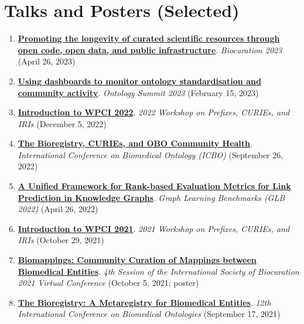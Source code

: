 \documentclass[10pt,a4paper,sans]{moderncv} %
\begin{document}
\section{Talks and Posters (Selected)}
\begin{enumerate}
\itemsep0.5em
    \item \textbf{\href{https://docs.google.com/presentation/d/1hEryoMNyp8gwt2pvPy2ErKaw_QPvnWOmzPT0Sn4Yl4s/edit?usp=sharing}{Promoting the longevity of curated scientific resources through open code, open data, and public infrastructure}}. \textit{Biocuration 2023} (April 26, 2023)

    \item \textbf{\href{https://docs.google.com/presentation/d/1oKxBzSCZGuFlIhw6jAXw00xgEGs7KgmaVR54NEdPprw/edit?usp=sharing}{Using dashboards to monitor ontology standardisation and community activity}}. \textit{Ontology Summit 2023} (February 15, 2023)

    \item \textbf{\href{https://docs.google.com/presentation/d/1Vq-tdq_PYSmKydKXEABElgt3oqYs_ridquHDLeUFL1A/edit?usp=sharing}{Introduction to WPCI 2022}}. \textit{2022 Workshop on Prefixes, CURIEs, and IRIs} (December 5, 2022)

    \item \textbf{\href{https://bit.ly/icbo2022-cth}{The Bioregistry, CURIEs, and OBO Community Health}}. \textit{International Conference on Biomedical Ontology (ICBO)} (September 26, 2022)

    \item \textbf{\href{https://bit.ly/glb2022-ranking-metrics}{A Unified Framework for Rank-based Evaluation Metrics for Link Prediction in Knowledge Graphs}}. \textit{Graph Learning Benchmarks (GLB 2022)} (April 26, 2022)

    \item \textbf{\href{https://bit.ly/WPCI2021}{Introduction to WPCI 2021}}. \textit{2021 Workshop on Prefixes, CURIEs, and IRIs} (October 29, 2021)

    \item \textbf{\href{https://f1000research.com/posters/10-1005}{Biomappings: Community Curation of Mappings between Biomedical Entities}}. \textit{4th Session of the International Society of Biocuration 2021 Virtual Conference} (October 5, 2021; poster)

    \item \textbf{\href{https://www.youtube.com/watch?v=9Pf5wr8JxCQ&t=1s}{The Bioregistry: A Metaregistry for Biomedical Entities}}. \textit{12th International Conference on Biomedical Ontologies} (September 17, 2021)


\end{enumerate}
\end{document}
